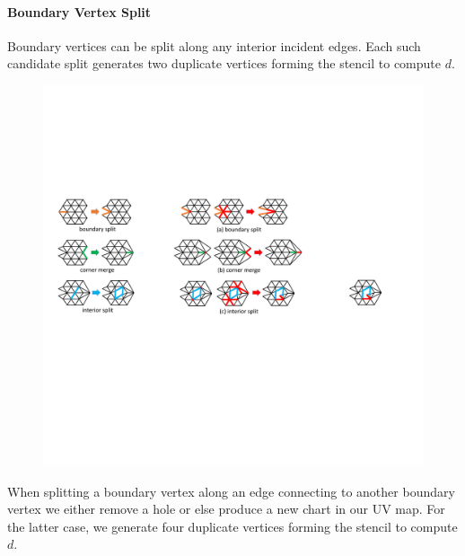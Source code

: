 \paragraph{Boundary Vertex Split}
Boundary vertices can be split along any interior incident edges. 
Each such candidate split generates two duplicate vertices forming the stencil to compute $d$.
\begin{figure}
  \begin{center}
  \vspace{-4mm}
    \includegraphics[width=1\linewidth]{fig/bSplit}
  \end{center}
\end{figure}
When splitting a boundary vertex along an edge connecting to another boundary vertex we either remove a hole or else produce a new chart in our UV map. For the latter case, we generate four duplicate vertices forming the stencil to compute $d$.

